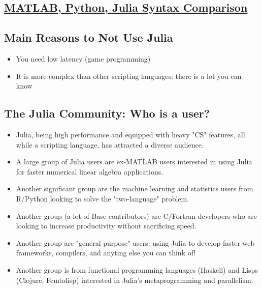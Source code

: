 \documentclass[11pt]{article}
\providecommand{\tightlist}{%
      \setlength{\itemsep}{0pt}\setlength{\parskip}{0pt}}
\begin{document}
    \subsection{\texorpdfstring{\href{http://cheatsheets.quantecon.org/}{MATLAB,
Python, Julia Syntax
Comparison}}{MATLAB, Python, Julia Syntax Comparison}}\label{matlab-python-julia-syntax-comparison}

    \subsection{Main Reasons to Not Use
Julia}\label{main-reasons-to-not-use-julia}

\begin{itemize}
\tightlist
\item
  You need low latency (game programming)
\item
  It is more complex than other scripting languages: there is a lot you
  can know
\end{itemize}

    \subsection{The Julia Community: Who is a
user?}\label{the-julia-community-who-is-a-user}

\begin{itemize}
\tightlist
\item
  Julia, being high performance and equipped with heavy "CS" features,
  all while a scripting language, has attracted a diverse audience.
\item
  A large group of Julia users are ex-MATLAB users interested in using
  Julia for faster numerical linear algebra applications.
\item
  Another significant group are the machine learning and statistics
  users from R/Python looking to solve the "two-language" problem.
\item
  Another group (a lot of Base contributors) are C/Fortran developers
  who are looking to increase productivity without sacrificing speed.
\item
  Another group are "general-purpose" users: using Julia to develop
  faster web frameworks, compilers, and anyting else you can think of!
\item
  Another group is from functional programming languages (Haskell) and
  Lisps (Clojure, Femtolisp) interested in Julia's metaprogramming and
  parallelism.
\end{itemize}
\end{document}
